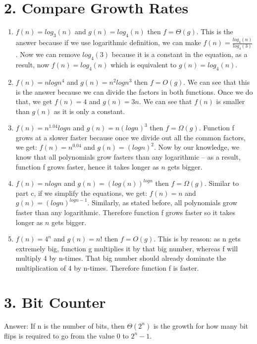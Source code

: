 \documentclass[11pt]{article}
\newenvironment{qparts}{\begin{enumerate}[{(}a{)}]}{\end{enumerate}}
\begin{document}
\section*{2. Compare Growth Rates}
\begin{qparts}
\item
$f(n) = log_3(n)$ and $g(n) = log_4(n)$ then $f = \Theta(g)$. This is the answer because if we use logarithmic definition, we can make $f(n) = \frac{log_4(n)}{log_4(3)}$. Now we can remove $log_4(3)$ because it is a constant in the equation, as a result, now $f(n) = log_4(n)$ which is equivalent to $g(n) = log_4(n)$. 

\item
$f(n) = nlogn^4$ and $g(n) = n^2logn^3$ then $f = O(g)$. We can see that this is the answer because we can divide the factors in both functions. Once we do that, we get $f(n) = 4$ and $g(n) = 3n$. We can see that $f(n)$ is smaller than $g(n)$ as it is only a constant.  

\item
$f(n) = n^{1.04}logn$ and $g(n) = n(logn)^3$ then $f = \Omega(g)$. Function f grows at a slower faster because once we divide out all the common factors, we get: $f(n) = n^{0.04}$ and $g(n) = (logn)^2$. Now by our knowledge, we know that all polynomials grow fasters than any logarithmic -- as a result, function f grows faster, hence it takes longer as $n$ gets bigger. 

\item
$f(n) = nlogn$ and $g(n) = (log(n))^{logn}$ then $f = \Omega(g)$. Similar to part c, if we simplify the equations, we get: $f(n) = n$ and $g(n) = (logn)^{logn-1}$. Similarly, as stated before, all polynomials grow faster than any logarithmic. Therefore function f grows faster so it takes longer as $n$ gets bigger. 

\item
$f(n) = 4^n$ and $g(n) = n!$ then $f = O(g)$. This is by reason: as n gets extremely big, function g multiplies it by that big number, whereas f will multiply 4 by n-times. That big number should already dominate the multiplication of 4 by n-times. Therefore function f is faster.

\end{qparts}


\newpage
\section*{3. Bit Counter}
Answer: If n is the number of bits, then $\Theta(2^n)$ is the growth for how many bit flips is required to go from the value 0 to $2^{n} - 1$. \\
\end{document}
